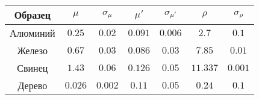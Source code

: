 \begin{tabular}{| c | c | c | c | c | c | c |}
\hline
Образец & $\mu$ & $\sigma_{\mu}$ & $\mu'$ & $\sigma_{\mu'}$ & $\rho$ &
$\sigma_{\rho}$\\
\hline
Алюминий & $0.25$ & $0.02$ & $0.091$ & $0.006$ & $2.7$ & $0.1$\\
\hline
Железо & $0.67$ & $0.03$ & $0.086$ & $0.03$ & $7.85$ & $0.01$ \\
\hline
Свинец & $1.43$ & $0.06$ & $0.126$ & $0.05$ & $11.337$ & $0.001$ \\
\hline
Дерево & $0.026$ & $0.002$ & $0.11$ & $0.05$ & $0.24$ & $0.1$ \\
\hline
\end{tabular}
